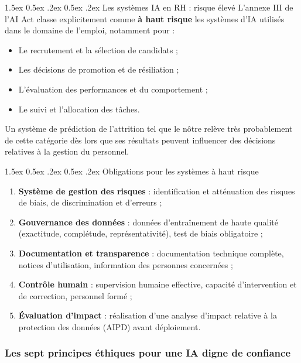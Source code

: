 \documentclass[12pt,a4paper]{article}
\makeatletter
\renewcommand\paragraph{\@startsection{paragraph}{4}{\z@}%
  {1.5ex \@plus 0.5ex \@minus .2ex}%
  {0.5ex \@plus .2ex}%
  {\normalfont\normalsize\bfseries}}
\makeatother
\begin{document}
\paragraph{Les systèmes IA en RH : risque élevé}
L'annexe III de l'AI Act classe explicitement comme \textbf{à haut risque} les systèmes d'IA utilisés dans le domaine de l'emploi, notamment pour :
\begin{itemize}
    \item Le recrutement et la sélection de candidats ;
    \item Les décisions de promotion et de résiliation ;
    \item L'évaluation des performances et du comportement ;
    \item Le suivi et l'allocation des tâches.
\end{itemize}
Un système de prédiction de l'attrition tel que le nôtre relève très probablement de cette catégorie dès lors que ses résultats peuvent influencer des décisions relatives à la gestion du personnel.

\paragraph{Obligations pour les systèmes à haut risque}
\begin{enumerate}
    \item \textbf{Système de gestion des risques} : identification et atténuation des risques de biais, de discrimination et d'erreurs ;
    \item \textbf{Gouvernance des données} : données d'entraînement de haute qualité (exactitude, complétude, représentativité), test de biais obligatoire ;
    \item \textbf{Documentation et transparence} : documentation technique complète, notices d'utilisation, information des personnes concernées ;
    \item \textbf{Contrôle humain} : supervision humaine effective, capacité d'intervention et de correction, personnel formé ;
    \item \textbf{Évaluation d'impact} : réalisation d'une analyse d'impact relative à la protection des données (AIPD) avant déploiement.
\end{enumerate}

\subsubsection{Les sept principes éthiques pour une IA digne de confiance}
\end{document}
